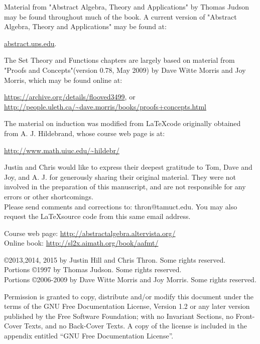 \documentclass[11pt]{book}
\numberwithin{equation}{section}
\begin{document}
\noindent
Material from "Abstract Algebra, Theory and Applications" by Thomas Judson may be found throughout much of the  book. 
A current version of "Abstract Algebra, Theory and Applications" may be found at: 
\begin{center}
 \url{abstract.ups.edu}.
\end{center}
The Set Theory and Functions chapters are largely based on material from  "Proofs and Concepts"(version 0.78, May 2009) by Dave Witte Morris and Joy Morris, which may be found online at:
\begin{center}
\url{https://archive.org/details/flooved3499}, or \\
\url{http://people.uleth.ca/~dave.morris/books/proofs+concepts.html}
\end{center}
The material on induction was modified from \LaTeX code originally obtained from A. J. Hildebrand, whose course web page is at:
\begin{center}
\url{http://www.math.uiuc.edu/~hildebr/}
\end{center}
\noindent
Justin and  Chris would like to express their deepest gratitude to Tom, Dave and Joy, and  A. J.  for generously sharing their original material. They were not involved in the preparation of this manuscript, and are not responsible for any errors or other shortcomings.\\[0.3cm]
Please send comments and corrections to: thron@tamuct.edu. You may also request the \LaTeX source code from this same email address.
\begin{center}
Course web page: \url{http://abstractalgebra.altervista.org/}\\
Online book: \url{http://sl2x.aimath.org/book/aafmt/}
\end{center}

\vfill
\copyright 2013,2014, 2015 by Justin Hill and Chris Thron. Some rights reserved.\\
Portions \copyright 1997 by Thomas Judson. Some rights reserved.\\
Portions \copyright 2006-2009 by Dave Witte Morris and Joy Morris. Some rights reserved.

Permission is granted to copy, distribute and/or modify this document under the terms of the GNU Free Documentation License, Version 1.2 or any later version published by the Free Software Foundation; with no Invariant Sections, no Front-Cover Texts, and no Back-Cover Texts.  A copy of the license is included in the appendix entitled ``GNU Free Documentation License''.
\end{document}
